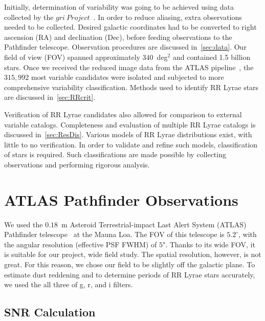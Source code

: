 \documentclass[aps,prb,twocolumn,superscriptaddress]{revtex4-1}
\begin{document}
Initially, determination of variability was going to be achieved using data collected by the $gri~Project$~\cite{gri}.  %
In order to reduce aliasing, extra observations needed to be collected.  Desired galactic coordinates had to 
be converted to right ascension (RA) and declination (Dec), before feeding observations to the Pathfinder telescope.
Observation procedures are discussed in~\cref{sec:data}.
Our field of view (FOV) spanned approximately $340$~deg$^{2}$ and contained 1.5 billion stars.  Once we received the reduced 
image data from the ATLAS pipeline~\cite{gri}, the $315,992$ most variable candidates were isolated and subjected to 
more comprehensive variability classification.  Methods used to identify RR Lyrae stars are discussed in~\cref{sec:RRcrit}.

\indent Verification of RR Lyrae candidates also allowed for comparison to external 
variable catalogs.  Completeness and evaluation of multiple RR Lyrae catalogs 
is discussed in~\cref{sec:ResDis}.  Various models of RR Lyrae distributions 
exist, with little to no verification.  In order to validate and refine such 
models, classification of stars is required.   Such classifications are made 
possible by collecting observations and performing rigorous analysis.
  


\section{ATLAS Pathfinder Observations}


We used the $0.18$~m Asteroid Terrestrial-impact Last Alert System (ATLAS) Pathfinder telescope~\citep{fallingstar} at the Mauna Loa. The FOV of this telescope is $5.2^{\circ}$, with the angular resolution (effective PSF FWHM) of $5$". Thanks to its wide FOV, it is suitable for our project, wide field study. The spatial resolution, however, is not great. For this reason, we chose our field to be slightly off the galactic plane. To estimate dust reddening and to determine periods of RR Lyrae stars accurately, we used the all three of g, r, and i filters.



\subsection{SNR Calculation}\label{sec:SNR}
\end{document}
